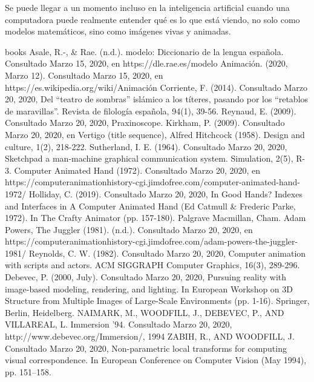 \documentclass[a4paper,12pt]{report}
\begin{document}
Se puede llegar a un momento incluso en la inteligencia artificial cuando una computadora puede realmente entender qué es lo que está viendo, no solo como modelos matemáticos, sino como imágenes vivas y animadas.
 
 
 
\begin{thebibliography} {books}
     Asale, R.-, \& Rae. (n.d.). modelo: Diccionario de la lengua española. Consultado Marzo 15, 2020, en https://dle.rae.es/modelo
     Animación. (2020, Marzo 12). Consultado Marzo 15, 2020, en https://es.wikipedia.org/wiki/Animación
     Corriente, F. (2014). Consultado Marzo 20, 2020, Del “teatro de sombras” islámico a los títeres, pasando por los ``retablos de maravillas''. Revista de filología española, 94(1), 39-56.
     Reynaud, E. (2009). Consultado Marzo 20, 2020, Praxinoscope.
     Kirkham, P. (2009). Consultado Marzo 20, 2020, en Vertigo (title sequence), Alfred Hitchcock (1958). Design and culture, 1(2), 218-222.
     Sutherland, I. E. (1964). Consultado Marzo 20, 2020, Sketchpad a man-machine graphical communication system. Simulation, 2(5), R-3.
     Computer Animated Hand (1972). Consultado Marzo 20, 2020, en https://computeranimationhistory-cgi.jimdofree.com/computer-animated-hand-1972/
     Holliday, C. (2019). Consultado Marzo 20, 2020, In Good Hands? Indexes and Interfaces in A Computer Animated Hand (Ed Catmull \& Frederic Parke, 1972). In The Crafty Animator (pp. 157-180). Palgrave Macmillan, Cham.
    Adam Powers, The Juggler (1981). (n.d.). Consultado Marzo 20, 2020, en https://computeranimationhistory-cgi.jimdofree.com/adam-powers-the-juggler-1981/
     Reynolds, C. W. (1982). Consultado Marzo 20, 2020, Computer animation with scripts and actors. ACM SIGGRAPH Computer Graphics, 16(3), 289-296.
     Debevec, P. (2000, July). Consultado Marzo 20, 2020, Pursuing reality with image-based modeling, rendering, and lighting. In European Workshop on 3D Structure from Multiple Images of Large-Scale Environments (pp. 1-16). Springer, Berlin, Heidelberg.
     NAIMARK, M., WOODFILL, J., DEBEVEC, P., AND VILLAREAL, L. Immersion ’94. Consultado Marzo 20, 2020, http://www.debevec.org/Immersion/, 1994
     ZABIH, R., AND WOODFILL, J. Consultado Marzo 20, 2020, Non-parametric local transforms for computing visual correspondence. In European Conference on Computer Vision (May 1994), pp. 151–158.

\end{thebibliography}
\end{document}
